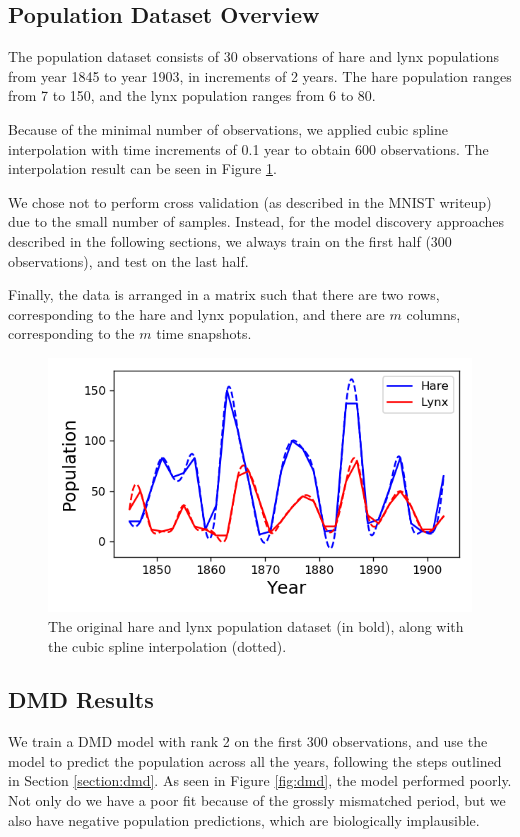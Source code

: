 \documentclass[letterpaper, 10 pt, conference]{ieeeconf}  %
\begin{document}
\subsection{Population Dataset Overview}
The population dataset consists of 30 observations of hare and lynx populations from year 1845 to year 1903, in increments of 2 years. The hare population ranges from 7 to 150, and the lynx population ranges from 6 to 80.

Because of the minimal number of observations, we applied cubic spline interpolation with time increments of 0.1 year to obtain 600 observations. The interpolation result can be seen in Figure \ref{fig:interpolated}.

We chose not to perform cross validation (as described in the MNIST writeup) due to the small number of samples. Instead, for the model discovery approaches described in the following sections, we always train on the first half (300 observations), and test on the last half.

Finally, the data is arranged in a matrix such that there are two rows, corresponding to the hare and lynx population, and there are $m$ columns, corresponding to the $m$ time snapshots. 

\begin{figure}[htb] 
\centering
\includegraphics[width=0.97\columnwidth]{images/interpolated.png}
\caption{The original hare and lynx population dataset (in bold), along with the cubic spline interpolation (dotted).}
\label{fig:interpolated}
\end{figure}

\subsection{DMD Results}
We train a DMD model with rank 2 on the first 300 observations, and use the model to predict the population across all the years, following the steps outlined in Section \ref{section:dmd}. As seen in Figure \ref{fig:dmd}, the model performed poorly. Not only do we have a poor fit because of the grossly mismatched period, but we also have negative population predictions, which are biologically implausible.
\end{document}
